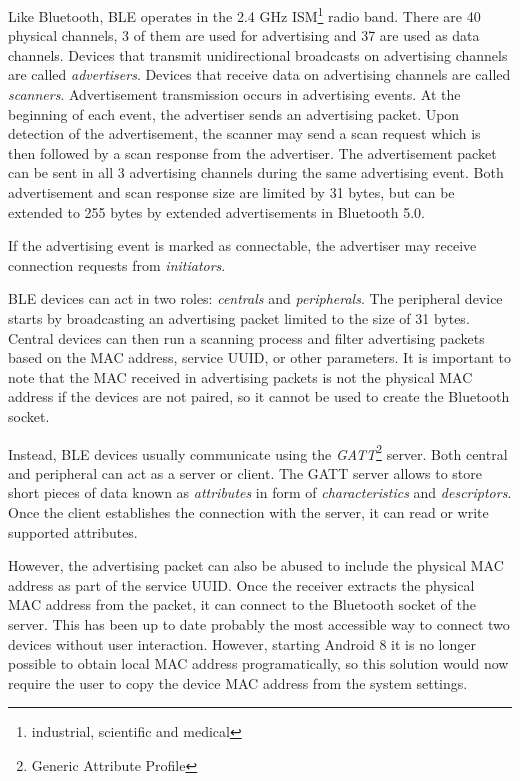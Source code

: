 \documentclass[conference,compsoc]{IEEEtran}
\begin{document}
Like Bluetooth, BLE operates in the 2.4 GHz ISM\footnote{industrial, scientific and medical} radio band. There are 40 physical channels, 3 of them are used for advertising and 37 are used as data channels. Devices that transmit unidirectional broadcasts on advertising channels are called \textit{advertisers}. Devices that receive data on advertising channels are called \textit{scanners}. Advertisement transmission occurs in advertising events. At the beginning of each event, the advertiser sends an advertising packet. Upon detection of the advertisement, the scanner may send a scan request which is then followed by a scan response from the advertiser. The advertisement packet can be sent in all 3 advertising channels during the same advertising event. Both advertisement and scan response size are limited by 31 bytes, but can be extended to 255 bytes by extended advertisements in Bluetooth 5.0. \cite{bluetooth51spec}

If the advertising event is marked as connectable, the advertiser may receive connection requests from \textit{initiators}.

BLE devices can act in two roles: \textit{centrals} and \textit{peripherals}. The peripheral device starts by broadcasting an advertising packet limited to the size of 31 bytes. Central devices can then run a scanning process and filter advertising packets based on the MAC address, service UUID, or other parameters. It is important to note that the MAC received in advertising packets is not the physical MAC address if the devices are not paired, so it cannot be used to create the Bluetooth socket. \cite{ble:privacy}

Instead, BLE devices usually communicate using the \textit{GATT}\footnote{Generic Attribute Profile} server. Both central and peripheral can act as a server or client. The GATT server allows to store short pieces of data known as \textit{attributes} in form of \textit{characteristics} and \textit{descriptors}. Once the client establishes the connection with the server, it can read or write supported attributes.

However, the advertising packet can also be abused to include the physical MAC address as part of the service UUID. Once the receiver extracts the physical MAC address from the packet, it can connect to the Bluetooth socket of the server. This has been up to date probably the most accessible way to connect two devices without user interaction. However, starting Android 8 it is no longer possible to obtain local MAC address programatically, so this solution would now require the user to copy the device MAC address from the system settings.
\end{document}
